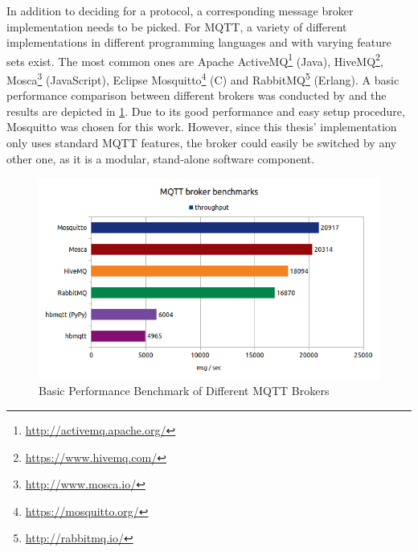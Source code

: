 In addition to deciding for a protocol, a corresponding message broker implementation needs to be picked. For MQTT, a variety of different implementations in different programming languages and with varying feature sets exist. The most common ones are Apache ActiveMQ\footnote{\url{http://activemq.apache.org/}} (Java), HiveMQ\footnote{\url{https://www.hivemq.com/}}, Mosca\footnote{\url{http://www.mosca.io/}} (JavaScript), Eclipse Mosquitto\footnote{\url{https://mosquitto.org/}} (C) and RabbitMQ\footnote{\url{http://rabbitmq.io/}} (Erlang). A basic performance comparison between different brokers was conducted by \cite{Mutsch2019} and the results are depicted in \cref{fig:mqtt_benchmarks}. Due to its good performance and easy setup procedure, Mosquitto was chosen for this work. However, since this thesis' implementation only uses standard MQTT features, the broker could easily be switched by any other one, as it is a modular, stand-alone software component.

\begin{figure}
	\centering
	\includegraphics[width=0.9\linewidth]{98_images/mqtt_bench_2}
	\caption[Basic Performance Benchmark of Different MQTT Brokers]{Basic Performance Benchmark of Different MQTT Brokers \cite{Mutsch2019}}
	\label{fig:mqtt_benchmarks}
\end{figure}

